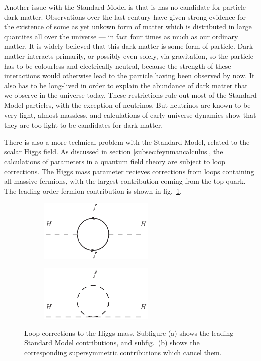 \documentclass[twoside,english]{uiofysmaster}
\begin{document}
Another issue with the Standard Model is that is has no candidate for particle dark matter. Observations over the last century have given strong evidence for the existence of some as yet unkown form of matter which is distributed in large quantites all over the universe --- in fact four times as much as our ordinary matter. It is widely believed that this dark matter is some form of particle. Dark matter interacts primarily, or possibly even solely, via gravitation, so the particle has to be colourless and electrically neutral, because the strength of these interactions would otherwise lead to the particle having been observed by now. It also has to be long-lived in order to explain the abundance of dark matter that we observe in the universe today. These restrictions rule out most of the Standard Model particles, with the exception of neutrinos. But neutrinos are known to be very light, almost massless, and calculations of early-universe dynamics show that they are too light to be candidates for dark matter. 

There is also a more technical problem with the Standard Model, related to the scalar Higgs field. As discussed in section \ref{subsec:feynmancalculus}, the calculations of parameters in a quantum field theory are subject to loop corrections. The Higgs mass parameter recieves corrections from loops containing all massive fermions, with the largest contribution coming from the top quark. The leading-order fermion contribution is shown in fig.\ \ref{fig:higgs_correction_a}.
\begin{figure}[htbp]
	\centering
	\begin{subfigure}[b]{0.49\textwidth}
		\centering
		\includegraphics[width=0.6\textwidth]{figures/susyintro/higgs_top_loop.eps}
		\caption{ }
		\label{fig:higgs_correction_a}
	\end{subfigure}
	\begin{subfigure}[b]{0.49\textwidth}
		\centering
		\includegraphics[width=0.6\textwidth]{figures/susyintro/higgs_stop_loop.eps}
		\caption{ }
		\label{fig:higgs_correction_b}
	\end{subfigure}
	\caption{Loop corrections to the Higgs mass. Subfigure (a) shows the leading Standard Model contributions, and subfig.\ (b) shows the corresponding supersymmetric contributions which cancel them.}
	\label{fig:higgs_correction}
\end{figure}
\end{document}
